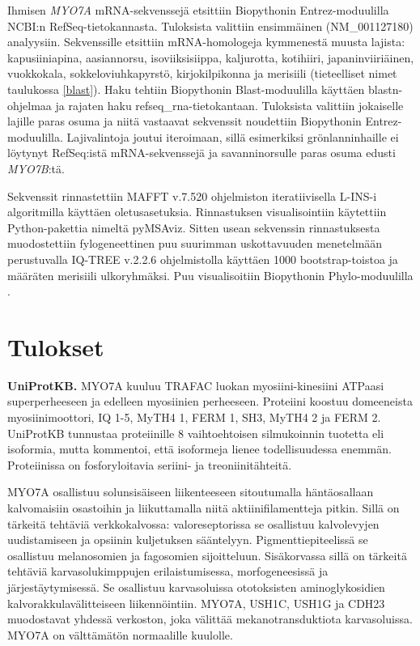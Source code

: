 \documentclass[a4paper,11pt,notitlepage]{article}
\begin{document}
Ihmisen \textit{MYO7A} mRNA-sekvenssejä etsittiin Biopythonin \cite{biopython} Entrez-moduulilla NCBI:n RefSeq-tietokannasta. Tuloksista valittiin ensimmäinen (NM\_001127180) analyysiin. Sekvenssille etsittiin mRNA-homologeja kym\-menestä muusta lajista: kapusiiniapina, aasiannorsu, isoviiksisiippa, kaljurotta, kotihiiri, japaninviiriäinen, vuokkokala, sokkeloviuhkapyrstö, kirjokilpikonna ja merisiili (tieteelliset nimet taulukossa \ref{blast}). Haku tehtiin Biopythonin Blast-moduulilla käyttäen blastn-ohjelmaa ja rajaten haku refseq\_rna-tieto\-kantaan. Tuloksista valittiin jokaiselle lajille paras osuma ja niitä vastaavat sekvenssit noudettiin Biopythonin Entrez-moduulilla. Lajivalintoja joutui iteroimaan, sillä esimerkiksi grönlanninhaille ei löytynyt RefSeq:istä mRNA-sekvenssejä ja savanninorsulle paras osuma edusti \textit{MYO7B}:tä.

Sekvenssit rinnastettiin MAFFT v.7.520 \cite{mafftv7} ohjelmiston iteratiivisella L-INS-i algoritmilla käyttäen oletusasetuksia. Rinnastuksen visualisointiin käytettiin Python-pakettia nimeltä pyMSAviz. Sitten usean sekvenssin rinnastuksesta muodostettiin fylogeneettinen puu suurimman uskottavuuden menetelmään perustuvalla IQ-TREE v.2.2.6 \cite{iqtree} ohjelmistolla käyttäen 1000 bootstrap-toistoa ja määräten merisiili ulkoryhmäksi. Puu visualisoitiin Biopythonin Phylo-moduulilla \cite{phylo}.


\section{Tulokset}
\textbf{UniProtKB.} MYO7A kuuluu TRAFAC luokan myosiini-kinesiini ATPaasi superperheeseen ja edelleen myosiinien perheeseen. Proteiini koostuu domeeneista myosiinimoottori, IQ 1-5, MyTH4 1, FERM 1, SH3, MyTH4 2 ja FERM 2. UniProtKB tunnustaa proteiinille 8 vaihtoehtoisen silmukoinnin tuotetta eli isoformia, mutta kommentoi, että isoformeja lienee todellisuudessa enemmän. Proteiinissa on fosforyloitavia seriini- ja treoniinitähteitä.

MYO7A osallistuu solunsisäiseen liikenteeseen sitoutumalla häntäosallaan kalvomaisiin osastoihin ja liikuttamalla niitä aktiinifilamentteja pitkin. Sillä on tärkeitä tehtäviä verkkokalvossa: valoreseptorissa se osallistuu kalvolevyjen uudistamiseen ja opsiinin kuljetuksen sääntelyyn. Pigmenttiepiteelissä se osallistuu melanosomien ja fagosomien sijoitteluun. Sisäkorvassa sillä on tärkeitä tehtäviä karvasolukimppujen erilaistumisessa, morfogeneesissä ja järjestäytymisessä. Se osallistuu karvasoluissa ototoksisten aminoglykosidien kalvorakkulavälitteiseen liikennöintiin. MYO7A, USH1C, USH1G ja CDH23 muodostavat yhdessä verkoston, joka välittää mekanotransduktiota karvasoluissa. MYO7A on välttämätön normaalille kuulolle.
\end{document}
